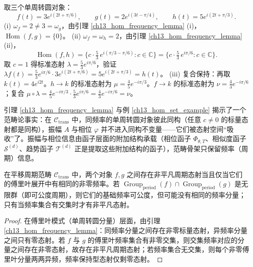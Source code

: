 \begin{example}[单周转圆态射集的具体计算]\label{ch13_hom_set_example}
取三个单周转圆对象：
\[
f(t) = 3 e^{i(2t + \pi/6)}, \qquad g(t) = 2 e^{i(3t - \pi/4)}, \qquad h(t) = 5 e^{i(2t + \pi/3)}.
\]
(i) $\omega_f = 2 \neq 3 = \omega_g$，由引理 \ref{ch13_hom_frequency_lemma} (i)，$\operatorname{Hom}(f, g) = \{0\}$。
(ii) $\omega_f = \omega_h = 2$，由引理 \ref{ch13_hom_frequency_lemma} (ii)，
\[
\operatorname{Hom}(f, h) = \Big\{ c \cdot \tfrac{5}{3}\, e^{i(\pi/3 - \pi/6)} : c \in \mathbb{C} \Big\} = \Big\{ c \cdot \tfrac{5}{3}\, e^{i\pi/6} : c \in \mathbb{C} \Big\}.
\]
取 $c = 1$ 得标准态射 $\lambda = \tfrac{5}{3} e^{i\pi/6}$，验证 $\lambda f(t) = \tfrac{5}{3} e^{i\pi/6} \cdot 3 e^{i(2t + \pi/6)} = 5 e^{i(2t + \pi/3)} = h(t)$。
(iii) 复合保持：再取 $k(t) = 4 e^{i 2t}$。$h \to k$ 的标准态射为 $\mu = \tfrac{4}{5} e^{-i\pi/3}$。$f \to k$ 的标准态射为 $\nu = \tfrac{4}{3} e^{-i\pi/6}$；复合 $\mu \circ \lambda = \tfrac{4}{5} e^{-i\pi/3} \cdot \tfrac{5}{3} e^{i\pi/6} = \tfrac{4}{3} e^{-i\pi/6} = \nu$。
\end{example}

\begin{remark}[振幅与相位不是平移周期范畴的不变量]\label{ch13_amplitude_phase_remark}
引理 \ref{ch13_hom_frequency_lemma} 与例 \ref{ch13_hom_set_example} 揭示了一个范畴论事实：在 $\mathcal{C}_{\text{trans}}$ 中，同频率的单周转圆对象彼此同构（任意 $c \neq 0$ 的标量态射都是同构），振幅 $A$ 与相位 $\varphi$ 并不进入同构不变量——它们被态射空间“吸收”了。振幅与相位信息由函子层面的附加结构承载（相位函子 $\Phi_{\theta, T}$、相似度函子 $\mathcal{S}^{(d)}$、趋势函子 $\mathcal{T}^{(d)}$ 正是提取这些附加结构的函子），范畴骨架只保留频率（周期）信息。
\end{remark}

\begin{proposition}[平移周期范畴的相似度结构]\label{prop:translation_category_similarity}
在平移周期范畴 $\mathcal{C}_{\text{trans}}$ 中，两个对象 $f, g$ 之间存在非平凡周期态射当且仅当它们的傅里叶展开中有相同的非零频率。若 $\operatorname{Group}_{\mathrm{period}}(f) \cap \operatorname{Group}_{\mathrm{period}}(g)$ 是无限群（即可公度周期），则它们的基础频率可公度，但可能没有相同的频率分量；只有当频率集合有交集时才有非平凡态射。
\end{proposition}

\begin{proof}
在傅里叶模式（单周转圆分量）层面，由引理 \ref{ch13_hom_frequency_lemma}：同频率分量之间存在非零标量态射，异频率分量之间只有零态射。若 $f$ 与 $g$ 的傅里叶频率集合有非零交集，则交集频率对应的分量之间存在非零态射，故存在非平凡周期态射；若频率集合无交集，则每个非零傅里叶分量两两异频，频率保持型态射仅剩零态射。
\end{proof}

